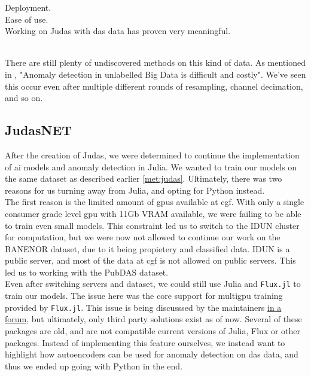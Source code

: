 Deployment. \\ 

Ease of use. \\ 
Working on Judas with \acrshort{das} data has proven very meaningful. \\\

There are still plenty of undiscovered methods on this kind of data. As mentioned in \cite{MALEKI2021107443}, "Anomaly detection in unlabelled Big Data is difficult and costly". We've seen this occur even after multiple different rounds of resampling, channel decimation, and so on. 
 

\subsection{JudasNET}

After the creation of Judas, we were determined to continue the implementation of \acrshort{ai} models and anomaly detection in Julia. We wanted to train our models on the same dataset as described earlier \ref{met:judas}. Ultimately, there was two reasons for us turning away from Julia, and opting for Python instead. \\

The first reason is the limited amount of \acrshort{gpu}s available at \acrshort{cgf}. With only a single consumer grade level \acrshort{gpu} with 11Gb VRAM available, we were failing to be able to train even small models. This constraint led us to switch to the IDUN cluster for computation, but we were now not allowed to continue our work on the BANENOR dataset, due to it being propietery and classified data. IDUN is a public server, and most of the data at \acrshort{cgf} is not allowed on public servers. This led us to working with the PubDAS dataset. \\

Even after switching servers and dataset, we could still use Julia and \texttt{Flux.jl} to train our models. The issue here was the core support for multigpu training provided by \texttt{Flux.jl}. This issue is being discusssed by the maintainers \href{https://github.com/FluxML/Flux.jl/issues/1829}{in a forum}, but ultimately, only third party solutions exist as of now. Several of these packages are old, and are not compatible current versions of Julia, Flux or other packages. Instead of implementing this feature ourselves, we instead want to highlight how autoencoders can be used for anomaly detection on \acrshort{das} data, and thus we ended up going with Python in the end. 

